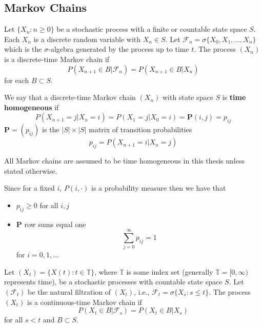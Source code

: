 \subsection{Markov Chains}

\begin{defn} \cite{schapira2017}
Let $\{X_n : n \geq 0\}$ be a stochastic process with a finite or countable state space $S$.
Each $X_n$ is a discrete random variable with $X_n \in S$.
Let $\mathscr{F}_n = \sigma\{X_0, X_1, \ldots, X_n\}$ which is the $\sigma$-algebra generated by the process up to time $t$.
The process $(X_n)$ is a discrete-time Markov chain if
$$
P(X_{n + 1} \in B | \mathscr{F}_n) = P(X_{n + 1} \in B | X_n)
$$
for each $B \subset S$.
\end{defn}

\begin{defn}\cite{grimmett2001}
We say that a discrete-time Markov chain $(X_n)$ with state space $S$ is \textbf{time homogeneous} if
$$
P(X_{n + 1} = j | X_n = i) = P(X_{1} = j | X_0 = i) = \mathbf{P}(i,j) = p_{ij}
$$
$\mathbf{P} = (p_{ij})$ is the $|S| \times |S|$ matrix of transition probabilities
$$
p_{ij} = P(X_{n + 1} = i | X_n = j)
$$

All Markov chains are assumed to be time homogeneous in this thesis unless stated otherwise.
\end{defn}

\begin{remark}
Since for a fixed $i$, $P(i, \cdot)$ is a probability measure then we have that
\begin{itemize}
    \item $p_{ij} \geq 0$ for all $i,j$
    \item $\mathbf{P}$ row sums equal one
    $$
    \sum_{j = 0}^\infty p_{ij} = 1
    $$
    for $i = 0, 1, \ldots$
\end{itemize}
\end{remark}

\begin{defn} \cite{schapira2017}
Let $(X_t) = \{X(t) : t \in \mathbb T\}$, where $\mathbb T$ is some index set (generally $\mathbb T = [0, \infty)$ represents time), be a stochastic processes with countable state space $S$.
Let $(\mathscr{F}_t)$ be the natural filtration of $(X_t)$, i.e., $\mathscr{F}_t = \sigma\{ X_s : s \leq t \}$.
The process $(X_t)$ is a continuous-time Markov chain if
$$
P(X_{t} \in B | \mathscr{F}_s) = P(X_{t} \in B | X_s)
$$
for all $s < t$ and $B \subset S$.

\end{defn}

